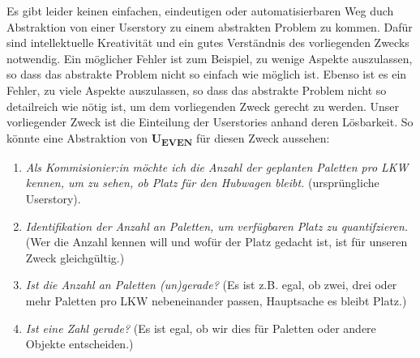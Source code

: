 Es gibt leider keinen einfachen, eindeutigen oder automatisierbaren Weg
duch Abstraktion von einer Userstory zu einem abstrakten Problem zu kommen.
Dafür sind intellektuelle Kreativität
und ein gutes Verständnis des vorliegenden Zwecks notwendig.
Ein möglicher Fehler ist zum Beispiel,
zu wenige Aspekte auszulassen,
so dass das abstrakte Problem nicht so einfach wie möglich ist. 
Ebenso ist es ein Fehler, zu viele Aspekte auszulassen,
so dass das abstrakte Problem nicht so detailreich wie nötig ist,
um dem vorliegenden Zweck gerecht zu werden.
Unser vorliegender Zweck ist die Einteilung der Userstories anhand deren Lösbarkeit.
So könnte eine Abstraktion von \textbf{U\textsubscript{EVEN}} für diesen Zweck aussehen:
\begin{enumerate}
    \item \emph{Als Kommisionier:in
         möchte ich die Anzahl der geplanten Paletten pro LKW kennen,
         um zu sehen, ob Platz für den Hubwagen bleibt.
        } (ursprüngliche Userstory).
    \item \emph{Identifikation der Anzahl an Paletten, um verfügbaren Platz zu quantifzieren.}
        (Wer die Anzahl kennen will und wofür der Platz gedacht ist,
        ist für unseren Zweck gleichgültig.)
    \item \emph{Ist die Anzahl an Paletten (un)gerade?}
        (Es ist z.B. egal,
        ob zwei, drei oder mehr Paletten pro LKW nebeneinander passen,
        Hauptsache es bleibt Platz.)
    \item \emph{Ist eine Zahl gerade?}
        (Es ist egal, ob wir dies für Paletten oder andere Objekte entscheiden.)
\end{enumerate}

